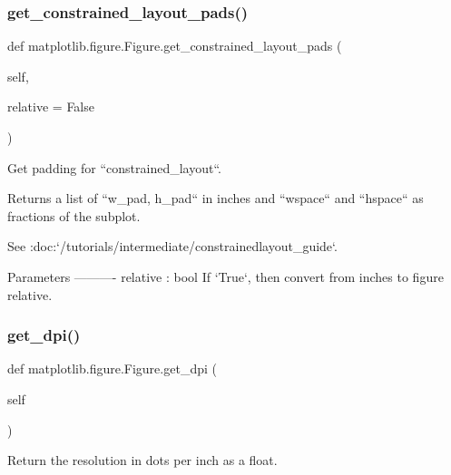 \subsubsection{\texorpdfstring{get\+\_\+constrained\+\_\+layout\+\_\+pads()}{get\_constrained\_layout\_pads()}}
{\footnotesize\ttfamily def matplotlib.\+figure.\+Figure.\+get\+\_\+constrained\+\_\+layout\+\_\+pads (\begin{DoxyParamCaption}\item[{}]{self,  }\item[{}]{relative = {\ttfamily False} }\end{DoxyParamCaption})}

\begin{DoxyVerb}Get padding for ``constrained_layout``.

Returns a list of ``w_pad, h_pad`` in inches and
``wspace`` and ``hspace`` as fractions of the subplot.

See :doc:`/tutorials/intermediate/constrainedlayout_guide`.

Parameters
----------
relative : bool
    If `True`, then convert from inches to figure relative.
\end{DoxyVerb}
 \mbox{\label{classmatplotlib_1_1figure_1_1Figure_a8b61c446899e78d84ab5ac953af96805}} 
\subsubsection{\texorpdfstring{get\+\_\+dpi()}{get\_dpi()}}
{\footnotesize\ttfamily def matplotlib.\+figure.\+Figure.\+get\+\_\+dpi (\begin{DoxyParamCaption}\item[{}]{self }\end{DoxyParamCaption})}

\begin{DoxyVerb}Return the resolution in dots per inch as a float.\end{DoxyVerb}
 \mbox{\label{classmatplotlib_1_1figure_1_1Figure_a04561b8cd81fbdc15ddccd20e8d8893e}} 
